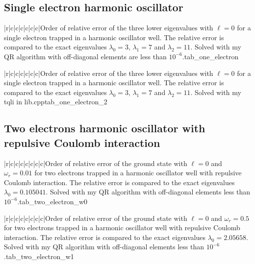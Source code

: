 \documentclass[11pt,english,a4paper]{article}
\begin{document}
\begin{flushleft}
\newpage
\subsection{Single electron harmonic oscillator}\label{sec_single_electron}

\begin{tabell}{|r|c|c|c|c|c|c|}{\small}{}{}{Order of relative error of the three lower eigenvalues with $\ell = 0$ for a single electron trapped in a harmonic oscillator well. The relative error is compared to the exact eigenvalues  $\lambda_0 = 3$, $\lambda_1 = 7$ and $\lambda_2 = 11$. Solved with my QR algorithm with off-diagonal elements are less than $10^{-6}$.}{tab_one_electron}
\end{tabell}

\begin{tabell}{|r|c|c|c|c|c|c|}{\small}{}{}{Order of relative error of the three lower eigenvalues with $\ell = 0$ for a single electron trapped in a harmonic oscillator well. The relative error is compared to the exact eigenvalues  $\lambda_0 = 3$, $\lambda_1 = 7$ and $\lambda_2 = 11$. Solved with my tqli in lib.cpp}{tab_one_electron_2}
\end{tabell}

\subsection{Two electrons harmonic oscillator with repulsive Coulomb interaction}\label{sec_two electrons}

\begin{tabell}{|r|c|c|c|c|c|c|c|}{\small}{}{}{Order of relative error of the ground state with $\ell = 0$ and $\omega_r = 0.01$ for two electrons trapped in a harmonic oscillator well with repulsive Coulomb interaction. The relative error is compared to the exact eigenvalues  $\lambda_0 = 0.105041$. Solved with my QR algorithm with off-diagonal elements less than $10^{-6}$.}{tab_two_electron_w0}
\end{tabell}

\begin{tabell}{|r|c|c|c|c|c|c|c|}{\small}{}{}{Order of relative error of the ground state with $\ell = 0$ and $\omega_r = 0.5$ for two electrons trapped in a harmonic oscillator well with repulsive Coulomb interaction. The relative error is compared to the exact eigenvalues  $\lambda_0 = 2.05658$. Solved with my QR algorithm with off-diagonal elements less than $10^{-6}$.}{tab_two_electron_w1}
\end{tabell}


\end{flushleft}
\end{document}

